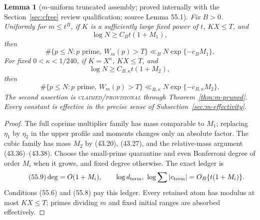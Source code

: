 \documentclass[10pt,reqno]{amsart}
\newtheorem{lemma}[theorem]{Lemma}
\theoremstyle{definition}
\newcommand{\1}{\mathbf 1}
\begin{document}
\begin{lemma}[$m$-uniform truncated assembly; proved internally with the
Section~\ref{sec:cfree} review qualification; source Lemma 55.1]
\label{lem:m-truncated}
Fix $B>0$.  Uniformly for $m\leq t^B$, if $K$ is a sufficiently large fixed
power of $t$, $KX\leq T$, and
\begin{equation}\tag{55.6}
                     \log N\geq C_Bt(1+M_1),
\end{equation}
then
\begin{equation}\tag{55.5}
 \#\{p\leq N:p\text{ prime},\ W_m(p)>T\}
       \ll_B N\exp\{-c_BM_1\}.
\end{equation}
For fixed $0<\kappa<1/240$, if $K=X^\kappa$, $KX\leq T$, and
\begin{equation}\tag{55.8}
                     \log N\geq C_{B,\kappa}t(1+M_2),
\end{equation}
then
\begin{equation}\tag{55.7}
 \#\{p\leq N:p\text{ prime},\ W_m(p)>T\}
       \ll_{B,\kappa}N\exp\{-c_{B,\kappa}M_2\}.
\end{equation}
The second assertion is \textsc{claimed/provisional} through
Theorem~\ref{thm:m-pruned}.  Every constant is effective in the precise
sense of Subsection~\ref{sec:m-effectivity}.
\end{lemma}
\begin{proof}
The full coprime multiplier family has mass comparable to $M_1$; replacing
$\eta_1$ by $\eta_2$ in the upper profile and moments changes only an
absolute factor.  The cubic family has mass $M_2$ by (43.20), (43.27), and
the relative-mass argument
(43.36)--(43.38).  Choose the small-prime quarantine and even Bonferroni
degree of order $M_i$ when it grows, and fixed degree otherwise.  The exact
ledger is
\begin{equation}\tag{55.9}
 \deg=O(1+M_i),\qquad
 \log d_{\rm term},\ \log\sum|c_{\rm term}|=O_B\{t(1+M_i)\}.
\end{equation}
Conditions (55.6) and (55.8) pay this ledger.  Every retained atom has
modulus at most $KX\leq T$; primes dividing $m$ and fixed initial ranges are
absorbed effectively.
\end{proof}
\end{document}
